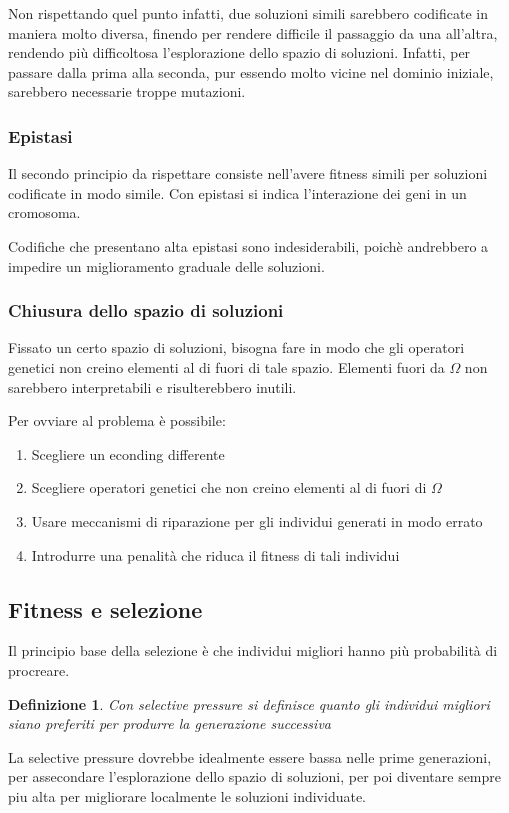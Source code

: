 \documentclass[a4paper]{article}
\newtheorem{definition}{Definizione}
\begin{document}
Non rispettando quel punto infatti, due soluzioni simili sarebbero codificate in maniera
molto diversa, finendo per rendere difficile il passaggio da una all'altra, rendendo più difficoltosa 
l'esplorazione dello spazio di soluzioni. Infatti, per passare dalla prima alla seconda, 
pur essendo molto vicine nel dominio iniziale, sarebbero necessarie troppe mutazioni.
\subsubsection{Epistasi}
Il secondo principio da rispettare consiste nell'avere fitness simili per soluzioni 
codificate in modo simile.
Con epistasi si indica l'interazione dei geni in un cromosoma.

Codifiche che presentano alta epistasi sono indesiderabili, poichè andrebbero a 
impedire un miglioramento graduale delle soluzioni.
\subsubsection{Chiusura dello spazio di soluzioni}
Fissato un certo spazio di soluzioni, bisogna fare in modo che gli operatori 
genetici non creino elementi al di fuori di tale spazio.
Elementi fuori da $\Omega$ non sarebbero interpretabili e risulterebbero inutili.

Per ovviare al problema è possibile:
\begin{enumerate}
    \item Scegliere un econding differente
    \item Scegliere operatori genetici che non creino elementi al di fuori di $\Omega$
    \item Usare meccanismi di riparazione per gli individui generati in modo errato
    \item Introdurre una penalità che riduca il fitness di tali individui
\end{enumerate}

\subsection{Fitness e selezione}
Il principio base della selezione è che individui migliori hanno più probabilità
di procreare. 
\begin{definition}
    Con selective pressure si definisce quanto gli individui migliori 
    siano preferiti per produrre la generazione successiva
\end{definition}
La selective pressure dovrebbe idealmente essere bassa nelle prime generazioni, 
per assecondare l'esplorazione dello spazio di soluzioni, per poi diventare sempre 
piu alta per migliorare localmente le soluzioni individuate.
\end{document}
